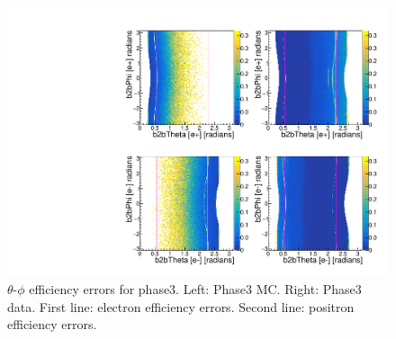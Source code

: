 \documentclass[a4paper,11pt,twosided,final,german,openbib,pdftex,listof=totoc,bibliography=totoc]{scrbook}
\begin{document}
\begin{appendix}
\begin{figure}[!htbp]
	\centering
	\includegraphics[width=\textwidth]{Plots/master3/xCEffTP_MCData_ErrorP3.pdf}
	\caption[$\theta$-$\phi$ Efficiency Error Plots Phase3]{$\theta$-$\phi$ efficiency errors for phase3. Left: Phase3 MC. Right: Phase3 data. First line: electron efficiency errors. Second line: positron efficiency errors.}
	\label{plt:xCEff_Error3}
\end{figure}












\listoffigures
\listoftables

\nocite{*}
\printbibliography[title={Bibliography}]




\end{appendix}
\end{document}

